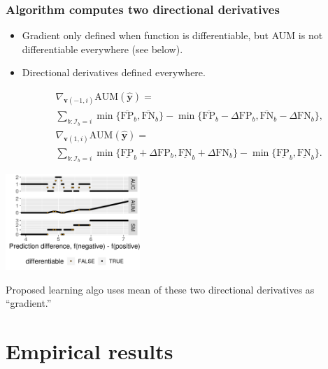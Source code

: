 \documentclass{beamer}
\begin{document}
\begin{frame}
  \frametitle{Algorithm computes two directional derivatives }

  \begin{itemize}
  \item Gradient only defined when function is differentiable, but AUM
    is not differentiable everywhere (see below).
  \item Directional derivatives defined everywhere.
  \end{itemize}
\begin{eqnarray*}
  &&\nabla_{\mathbf v(-1,i)} \text{AUM}(\mathbf{\hat y}) = \\
  &&\sum_{b: \mathcal I_b = i}
  \min\{
  \overline{\text{FP}}_b , 
  \overline{\text{FN}}_b 
  \}
  -
  \min\{
  \overline{\text{FP}}_b - \Delta\text{FP}_b, 
  \overline{\text{FN}}_b - \Delta\text{FN}_b
  \},\\
  &&\nabla_{\mathbf v(1,i)} \text{AUM}(\mathbf{\hat y}) = \\
  &&\sum_{b: \mathcal I_b = i}
  \min\{
  \underline{\text{FP}}_b + \Delta\text{FP}_b, 
  \underline{\text{FN}}_b + \Delta\text{FN}_b
  \}
  -
  \min\{
  \underline{\text{FP}}_b , 
  \underline{\text{FN}}_b 
     \}.
\end{eqnarray*}  

\parbox{2in}{ \includegraphics[width=2in]{figure-aum-convexity} }
\parbox{2in}{ Proposed learning algo uses mean of these two
  directional derivatives as ``gradient.''  }

\end{frame}


\section{Empirical results}
\end{document}
